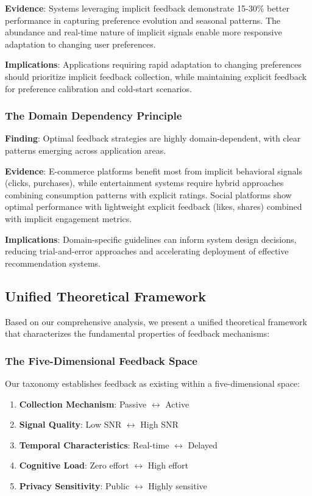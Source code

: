 \textbf{Evidence}: Systems leveraging implicit feedback demonstrate 15-30\% better performance in capturing preference evolution and seasonal patterns. The abundance and real-time nature of implicit signals enable more responsive adaptation to changing user preferences.

\textbf{Implications}: Applications requiring rapid adaptation to changing preferences should prioritize implicit feedback collection, while maintaining explicit feedback for preference calibration and cold-start scenarios.

\subsubsection{The Domain Dependency Principle}
\textbf{Finding}: Optimal feedback strategies are highly domain-dependent, with clear patterns emerging across application areas.

\textbf{Evidence}: E-commerce platforms benefit most from implicit behavioral signals (clicks, purchases), while entertainment systems require hybrid approaches combining consumption patterns with explicit ratings. Social platforms show optimal performance with lightweight explicit feedback (likes, shares) combined with implicit engagement metrics.

\textbf{Implications}: Domain-specific guidelines can inform system design decisions, reducing trial-and-error approaches and accelerating deployment of effective recommendation systems.

\subsection{Unified Theoretical Framework}

Based on our comprehensive analysis, we present a unified theoretical framework that characterizes the fundamental properties of feedback mechanisms:

\subsubsection{The Five-Dimensional Feedback Space}
Our taxonomy establishes feedback as existing within a five-dimensional space:
\begin{enumerate}
    \item \textbf{Collection Mechanism}: Passive $\leftrightarrow$ Active
    \item \textbf{Signal Quality}: Low SNR $\leftrightarrow$ High SNR  
    \item \textbf{Temporal Characteristics}: Real-time $\leftrightarrow$ Delayed
    \item \textbf{Cognitive Load}: Zero effort $\leftrightarrow$ High effort
    \item \textbf{Privacy Sensitivity}: Public $\leftrightarrow$ Highly sensitive
\end{enumerate}

